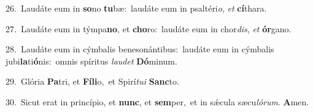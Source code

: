 {\numbfont\textcolor{\numbcolor}{26.}}~Laudáte eum in \textbf{so}\-no \textbf{tu}\-bæ:~\star laudáte eum in psaltéri\-\textit{o}\-, \textit{et} \textbf{cí}\-thara.\par
{\numbfont\textcolor{\numbcolor}{27.}}~Laudáte eum in týmpa\-\textbf{no}\-, et \textbf{cho}\-ro:~\star laudáte eum in chor\-\textit{dis}\-, \textit{et} \textbf{ór}\-gano.\par
{\numbfont\textcolor{\numbcolor}{28.}}~Laudáte eum in cýmbalis benesonántibus:~\dagger laudáte eum in cýmbalis jubi\-\textbf{la}\-ti\-\textbf{ó}\-nis:~\star omnis spíritus \textit{lau}\-\textit{det} \textbf{Dó}\-minum.\par
{\numbfont\textcolor{\numbcolor}{29.}}~Glória \textbf{Pa}\-tri, et \textbf{Fí}\-\textbf{li}o,~\star et Spirí\-\textit{tu}\-\textit{i} \textbf{Sanc}\-to.\par
{\numbfont\textcolor{\numbcolor}{30.}}~Sicut erat in princípio, et \textbf{nunc}\-, et \textbf{sem}\-per,~\star et in sǽcula sæcu\-\textit{ló}\-\textit{rum}. \textbf{A}\-men.\par
